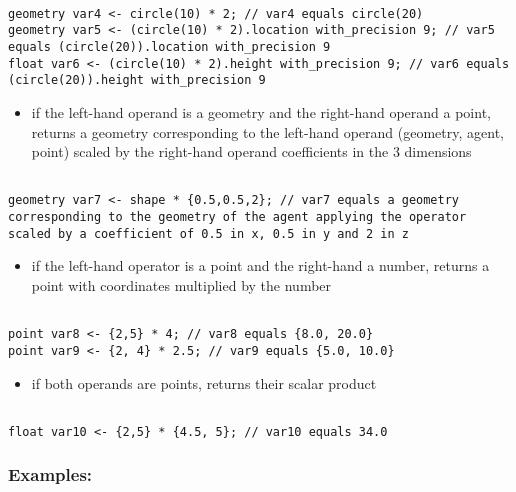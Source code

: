 \documentclass[]{book}
\providecommand{\tightlist}{%
  \setlength{\itemsep}{0pt}\setlength{\parskip}{0pt}}
\theoremstyle{definition}
\theoremstyle{definition}
\theoremstyle{definition}
\theoremstyle{remark}
\begin{document}
\begin{verbatim}
 
geometry var4 <- circle(10) * 2; // var4 equals circle(20) 
geometry var5 <- (circle(10) * 2).location with_precision 9; // var5 equals (circle(20)).location with_precision 9 
float var6 <- (circle(10) * 2).height with_precision 9; // var6 equals (circle(20)).height with_precision 9
\end{verbatim}

\begin{itemize}
\tightlist
\item
  if the left-hand operand is a geometry and the right-hand operand a
  point, returns a geometry corresponding to the left-hand operand
  (geometry, agent, point) scaled by the right-hand operand coefficients
  in the 3 dimensions
\end{itemize}

\begin{verbatim}
 
geometry var7 <- shape * {0.5,0.5,2}; // var7 equals a geometry corresponding to the geometry of the agent applying the operator scaled by a coefficient of 0.5 in x, 0.5 in y and 2 in z
\end{verbatim}

\begin{itemize}
\tightlist
\item
  if the left-hand operator is a point and the right-hand a number,
  returns a point with coordinates multiplied by the number
\end{itemize}

\begin{verbatim}
 
point var8 <- {2,5} * 4; // var8 equals {8.0, 20.0} 
point var9 <- {2, 4} * 2.5; // var9 equals {5.0, 10.0}
\end{verbatim}

\begin{itemize}
\tightlist
\item
  if both operands are points, returns their scalar product
\end{itemize}

\begin{verbatim}
 
float var10 <- {2,5} * {4.5, 5}; // var10 equals 34.0
\end{verbatim}

\subsubsection{Examples:}\label{examples-5}
\end{document}
